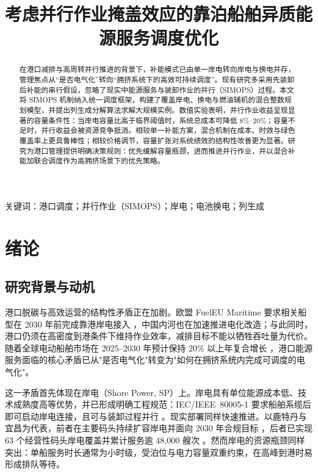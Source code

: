 \documentclass[UTF8, a4paper, 12pt]{ctexart}
\theoremstyle{plain}
\theoremstyle{definition}
\theoremstyle{remark}
\begin{document}
\title{\heiti{} 考虑并行作业掩盖效应的靠泊船舶异质能源服务调度优化}
\author{}
\date{}
\maketitle

\begin{abstract}
在港口减排与高周转并行推进的背景下，补能模式已由单一岸电转向岸电与换电并存，管理焦点从“是否电气化”转向“拥挤系统下的高效可持续调度”。现有研究多采用先装卸后补能的串行假设，忽略了现实中能源服务与装卸作业的并行（SIMOPS）过程。本文将 SIMOPS 机制纳入统一调度框架，构建了覆盖岸电、换电与燃油辅机的混合整数规划模型，并提出列生成分解算法求解大规模实例。数值实验表明，并行作业收益呈现显著的容量条件性：当岸电容量比高于临界阈值时，系统总成本可降低 8\%--20\%；容量不足时，并行收益会被资源竞争抵消。相较单一补能方案，混合机制在成本、时效与绿色覆盖率上更具鲁棒性；相较价格调节，容量扩张对系统绩效的结构性改善更为显著。研究为港口管理提供明确决策规则：优先缓解容量瓶颈，进而推进并行作业，并以混合补能加联合调度作为高拥挤场景下的优先策略。
\end{abstract}

\noindent 关键词：港口调度；并行作业（SIMOPS）；岸电；电池换电；列生成

\section{绪论}
\label{sec:intro}

\subsection{研究背景与动机}
港口脱碳与高效运营的结构性矛盾正在加剧。欧盟 FuelEU Maritime 要求相关船型在 2030 年前完成靠港岸电接入 \citep{EU2025}，中国内河也在加速推进电化改造；与此同时，港口仍须在高密度到港条件下维持作业效率，减排目标不能以牺牲吞吐量为代价。随着全球电动船舶市场在 2025--2030 年预计保持 20\% 以上年复合增长 \citep{Markets2025}，港口能源服务面临的核心矛盾已从"是否电气化"转变为"如何在拥挤系统内完成可调度的电气化"。
 
这一矛盾首先体现在岸电（Shore Power, SP）上。岸电具有单位能源成本低、技术成熟度高等优势，并已形成明确工程规范：IEC/IEEE~80005-1 要求船舶系缆后即可启动岸电连接，且可与装卸过程并行 \citep{IEC80005}。现实部署同样快速推进。以鹿特丹与宜昌为代表，前者在主要码头持续扩容岸电并面向 2030 年合规目标 \citep{Winkel2016}，后者已实现 63 个经营性码头岸电覆盖并累计服务逾 48{,}000 艘次 \citep{ICCT2023}。然而岸电的资源瓶颈同样突出：单船服务时长通常为小时级，受泊位与电力容量双重约束，在高峰到港时易形成排队等待。
 
\end{document}
